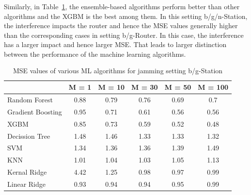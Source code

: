Similarly, in Table~\ref{ftml-jrnl:tab:T3}, the ensemble-based algorithms perform better than other algorithms and the XGBM is the best among them. In this setting b/g/n-Station, the interference impacts the router and hence the MSE values generally higher than the corresponding cases in setting b/g-Router. In this case, the interference has a larger impact and hence larger MSE. That leads to larger distinction between the performance of the machine learning algorithms. 
\begin{table}[!ht]
	\centering
	\caption{MSE values of various ML algorithms for jamming setting b/g-Station}
	\begin{tabular}{|p{5.3em}|c|c|c|c|c|}
		\toprule
		& \multicolumn{1}{p{2.4em}|}{M = 1} & \multicolumn{1}{p{2.9em}|}{M = 10} & \multicolumn{1}{p{2.9em}|}{M = 30} & \multicolumn{1}{p{2.9em}|}{M = 50} & \multicolumn{1}{p{3.4em}|}{M = 100} \\
		\midrule
		Random Forest	 & 0.88  & 0.79  & 0.76  & 0.69  & 0.7 \\
		\midrule
		Gradient Boosting  & 0.95  & 0.71  & 0.61  & 0.56  & 0.56 \\
		\midrule
		XGBM  & 0.85  & 0.73  & 0.59  & 0.52  & 0.48 \\
		\midrule
		Decission Tree & 1.48  & 1.46  & 1.33  & 1.33  & 1.32 \\
		\midrule
		SVM   & 1.34  & 1.36  & 1.36  & 1.39  & 1.49 \\
		\midrule
		KNN   & 1.01  & 1.04  & 1.03  & 1.05  & 1.13 \\
		\midrule
		Kernal Ridge & 4.42  & 1.25  & 0.98  & 0.97  & 0.99 \\
		\midrule
		Linear Ridge & 0.93  & 0.94  & 0.94  & 0.95  & 0.99 \\
		\bottomrule
	\end{tabular}%
	\label{ftml-jrnl:tab:T3}%
\end{table}%

